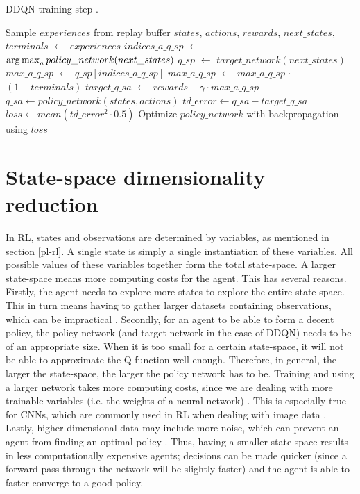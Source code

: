 \begin{algorithm}
\caption{DDQN training step \cite[p.299]{grokking}.}
\label{alg:ddqn}
\begin{algorithmic}[1]
\State Sample $experiences$ from replay buffer
\State $states$, $actions$, $rewards$, $next\_states$, $terminals$ $\gets$ $experiences$
\State $indices\_a\_q\_sp$ $\gets$ $\operatorname*{arg\,max}_a policy\_ network(next\_states)$
\State $q\_sp$ $\gets$ $target\_network(next\_states)$
\State $max\_a\_q\_sp$ $\gets$ $q\_sp[indices\_a\_q\_sp]$
\State $max\_a\_q\_sp$ $\gets$ $max\_a\_q\_sp$ $\cdot$ $(1-terminals)$ 
\State $target\_q\_sa$ $\gets$ $rewards + \gamma \cdot max\_a\_q\_sp$
\State $q\_sa \gets policy\_network(states, actions)$
\State $td\_error \gets q\_sa - target\_q\_sa$
\State $loss \gets mean(td\_error^2 \cdot 0.5)$
\State Optimize $policy\_network$ with backpropagation using $loss$
\end{algorithmic}
\end{algorithm}

\section{State-space dimensionality reduction}\label{pl-dimensionality}
In RL, states and observations are determined by variables, as mentioned in section \ref{pl-rl}. A single state is simply a single instantiation of these variables. All possible values of these variables together form the total state-space. A larger state-space means more computing costs for the agent. This has several reasons. Firstly, the agent needs to explore more states to explore the entire state-space. This in turn means having to gather larger datasets containing observations, which can be impractical \cite{AE_2019}. Secondly, for an agent to be able to form a decent policy, the policy network (and target network in the case of DDQN) needs to be of an appropriate size. When it is too small for a certain state-space, it will not be able to approximate the Q-function well enough. Therefore, in general, the larger the state-space, the larger the policy network has to be. Training and using a larger network takes more computing costs, since we are dealing with more trainable variables (i.e. the weights of a neural network) \cite{AE_2019}. This is especially true for CNNs, which are commonly used in RL when dealing with image data \cite{CNN_computation}. Lastly, higher dimensional data may include more noise, which can prevent an agent from finding an optimal policy \cite{AE_2016}. Thus, having a smaller state-space results in less computationally expensive agents; decisions can be made quicker (since a forward pass through the network will be slightly faster) and the agent is able to faster converge to a good policy. 

